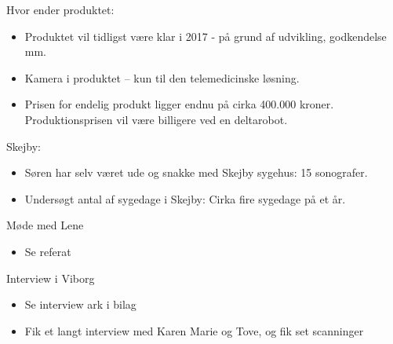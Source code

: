 Hvor ender produktet:
\begin{itemize}
\item Produktet vil tidligst være klar i 2017 - på grund af udvikling, godkendelse mm. 
\item Kamera i produktet – kun til den telemedicinske løsning.  
\item Prisen for endelig produkt ligger endnu på cirka 400.000 kroner. Produktionsprisen vil være billigere ved en deltarobot. 
\end{itemize}
Skejby:
\begin{itemize}
\item Søren har selv været ude og snakke med Skejby sygehus: 15 sonografer. 
\item Undersøgt antal af sygedage i Skejby: Cirka fire sygedage på et år.  
\end{itemize}
Møde med Lene
\begin{itemize}
\item Se referat
\end{itemize}
Interview i Viborg
\begin{itemize}
\item Se interview ark i bilag
\item Fik et langt interview med Karen Marie og Tove, og fik set scanninger
\end{itemize}
\newpage